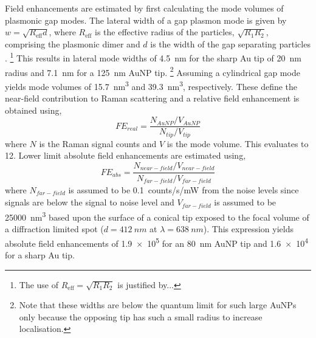 \documentclass{article}
\begin{document}
Field enhancements are estimated by first calculating the mode volumes of plasmonic gap modes. The lateral width of a gap plasmon mode is given by $w=\sqrt{R_{\mathrm{eff}}d}$, where $R_{\mathrm{eff}}$ is the effective radius of the particles, $\sqrt{R_1R_2}$, comprising the plasmonic dimer and $d$ is the width of the gap separating particles \cite{romero2006}.%
\footnote{The use of $R_{\mathrm{eff}}=\sqrt{R_1 R_2}$ is justified by...}
This results in lateral mode widths of \SI{4.5}{nm} for the sharp Au tip of \SI{20}{nm} radius and \SI{7.1}{nm} for a \SI{125}{nm} AuNP tip.%
\footnote{Note that these widths are below the quantum limit for such large AuNPs only because the opposing tip has such a small radius to increase localisation.}
Assuming a cylindrical gap mode yields mode volumes of \SI{15.7}{nm\cubed} and \SI{39.3}{nm\cubed}, respectively. These define the near-field contribution to Raman scattering and a relative field enhancement is obtained using,
\begin{equation}
\mathit{FE}_{real} = \frac{N_{\mathit{AuNP}} / V_{\mathit{AuNP}}}{N_{\mathit{tip}} / V_{\mathit{tip}}}
\end{equation}
where $N$ is the Raman signal counts and $V$ is the mode volume. This evaluates to 12. Lower limit absolute field enhancements are estimated using,
\begin{equation}
\mathit{FE}_{abs} = \frac{N_{\mathit{near-field}} / V_{\mathit{near-field}}}{N_{\mathit{far-field}} / V_{\mathit{far-field}}}
\end{equation}
where $N_{\mathit{far-field}}$ is assumed to be \SI{0.1}{counts/s/mW} from the noise levels since signals are below the signal to noise level and $V_{\mathit{far-field}}$ is assumed to be \SI{25000}{nm\cubed} based upon the surface of a conical tip exposed to the focal volume of a diffraction limited spot ($d = \SI{412}{nm}$ at $\lambda = \SI{638}{nm}$). This expression yields absolute field enhancements of \num{1.9e5} for an \SI{80}{nm} AuNP tip and \num{1.6e4} for a sharp Au tip.
\end{document}
